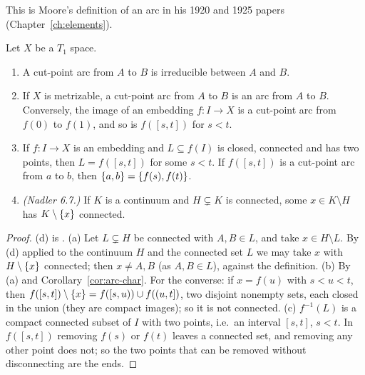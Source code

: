 
This is Moore's definition of an arc in his 1920 and 1925 papers (Chapter~\ref{ch:elements}).

\begin{proposition}\label{prop:cutarc}
Let $X$ be a $T_1$ space.
\begin{enumerate}[label=(\alph*)]
\item A cut-point arc from $A$ to $B$ is irreducible between $A$ and $B$.
\item If $X$ is metrizable, a cut-point arc from $A$ to $B$ is an arc from $A$ to $B$. Conversely,
the image of an embedding $f\colon I\to X$ is a cut-point arc from $f(0)$ to $f(1)$, and so is
$f([s,t])$ for $s<t$.
\item If $f\colon I\to X$ is an embedding and $L\subseteq f(I)$ is closed, connected and has two
points, then $L=f([s,t])$ for some $s<t$. If $f([s,t])$ is a cut-point arc from $a$ to $b$, then
$\left\{ a,b \right\}=\left\{ f(s),f(t) \right\}$.
\item \emph{(Nadler 6.7.)} If $K$ is a continuum and $H\subsetneq K$ is connected, some $x\in
K\setminus H$ has $K\setminus\left\{ x \right\}$ connected.
\end{enumerate}
\end{proposition}

\begin{proof}
(d) is .
(a) Let $L\subsetneq H$ be connected with $A,B\in L$, and take $x\in H\setminus L$. By (d) applied to
the continuum $H$ and the connected set $L$ we may take $x$ with $H\setminus\left\{ x \right\}$ connected; then
$x\ne A,B$ (as $A,B\in L$), against the definition.
(b) By (a) and Corollary~\ref{cor:arc-char}. For the converse: if $x=f(u)$ with $s<u<t$, then
$f([s,t])\setminus\left\{ x \right\}=f([s,u))\cup f((u,t])$, two disjoint nonempty sets, each closed in the
union (they are compact images); so it is not connected.
(c) $f^{-1}(L)$ is a compact connected subset of $I$ with two points, i.e.\ an interval $[s,t]$,
$s<t$. In $f([s,t])$ removing $f(s)$ or $f(t)$ leaves a connected set, and removing any other point
does not; so the two points that can be removed without disconnecting are the ends.
\end{proof}


